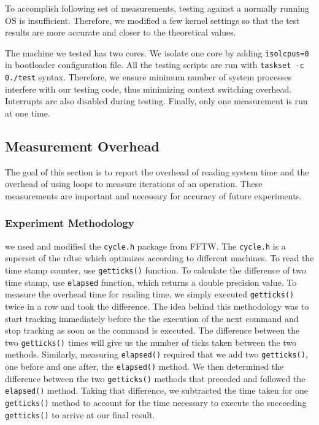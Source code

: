 \documentclass{article} %
\begin{document}
To accomplish following set of measurements, testing against a normally
running OS is insufficient. Therefore, we modified a few kernel settings so
that the test results are more accurate and closer to the theoretical values.

The machine we tested has two cores. We isolate one core by adding
\texttt{isolcpus=0} in bootloader configuration file. All the testing scripts
are run with \texttt{taskset -c 0\space./test} syntax. Therefore, we ensure minimum
number of system processes interfere with our testing code, thus minimizing
context switching overhead. Interrupts are also disabled during testing.
Finally, only one measurement is run at one time.

\subsection{Measurement Overhead}
The goal of this section is to report the overhead of reading system time and
the overhead of using loops to measure iterations of an operation.  These
measurements are important and necessary for accuracy of future experiments.

\subsubsection{Experiment Methodology}
we used and modified the \texttt{cycle.h} package from FFTW\cite{FFTW}.  The
\texttt{cycle.h} is a superset of the rdtsc which optimizes according to
different machines.  To read the time stamp counter, use \texttt{getticks()}
function. To calculate the difference of two time stamp, use \texttt{elapsed}
function, which returns a double precision value.  To measure the overhead
time for reading time, we simply executed \texttt{getticks()} twice in a row
and took the difference. The idea behind this methodology was to start
tracking immediately before the the execution of the next command and stop
tracking as soon as the command is executed. The difference between the two
\texttt{getticks()} times will give us the number of ticks taken between the
two methods. Similarly, measuring \texttt{elapsed()} required that we add two
\texttt{getticks()}, one before and one after, the \texttt{elapsed()} method.
We then determined the difference between the two \texttt{getticks()} methods
that preceded and followed the \texttt{elapsed()} method. Taking that
difference, we subtracted the time taken for one \texttt{getticks()} method to
account for the time necessary to execute the succeeding \texttt{getticks()}
to arrive at our final result.
\end{document}
